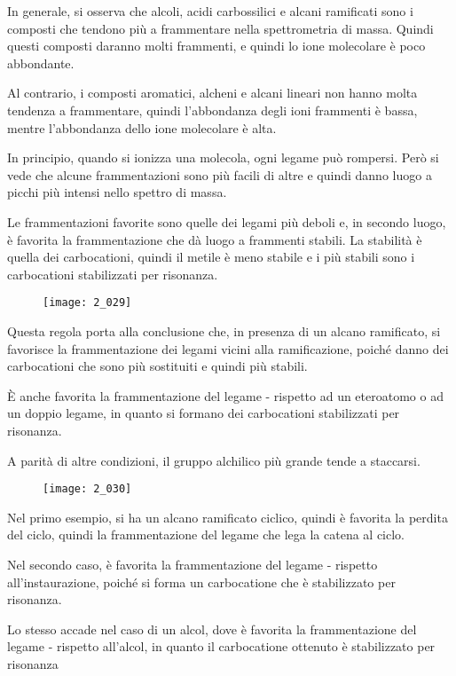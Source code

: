 In generale, si osserva che alcoli, acidi carbossilici e alcani
ramificati sono i composti che tendono più a frammentare nella
spettrometria di massa. Quindi questi composti daranno molti frammenti,
e quindi lo ione molecolare è poco abbondante.

Al contrario, i composti aromatici, alcheni e alcani lineari non hanno
molta tendenza a frammentare, quindi l'abbondanza degli ioni frammenti è
bassa, mentre l'abbondanza dello ione molecolare è alta.

In principio, quando si ionizza una molecola, ogni legame può rompersi.
Però si vede che alcune frammentazioni sono più facili di altre e quindi
danno luogo a picchi più intensi nello spettro di massa.

Le frammentazioni favorite sono quelle dei legami più deboli e, in
secondo luogo, è favorita la frammentazione che dà luogo a frammenti
stabili. La stabilità è quella dei carbocationi, quindi il metile è meno
stabile e i più stabili sono i carbocationi stabilizzati per risonanza.

\begin{figure}[H]
  \texttt{[image: 2\_029]}
\end{figure}

Questa regola porta alla conclusione che, in presenza di un alcano
ramificato, si favorisce la frammentazione dei legami vicini alla
ramificazione, poiché danno dei carbocationi che sono più sostituiti e
quindi più stabili.

È anche favorita la frammentazione del legame \alpha-\beta{} rispetto ad
un eteroatomo o ad un doppio legame, in quanto si formano dei
carbocationi stabilizzati per risonanza.

A parità di altre condizioni, il gruppo alchilico più grande tende a
staccarsi.

\begin{figure}[H]
  \texttt{[image: 2\_030]}
\end{figure}

Nel primo esempio, si ha un alcano ramificato ciclico, quindi è favorita
la perdita del ciclo, quindi la frammentazione del legame che lega la
catena al ciclo.

Nel secondo caso, è favorita la frammentazione del legame \alpha-\beta{}
rispetto all'instaurazione, poiché si forma un carbocatione che è
stabilizzato per risonanza.

Lo stesso accade nel caso di un alcol, dove è favorita la frammentazione
del legame \alpha-\beta{} rispetto all'alcol, in quanto il carbocatione
ottenuto è stabilizzato per risonanza

